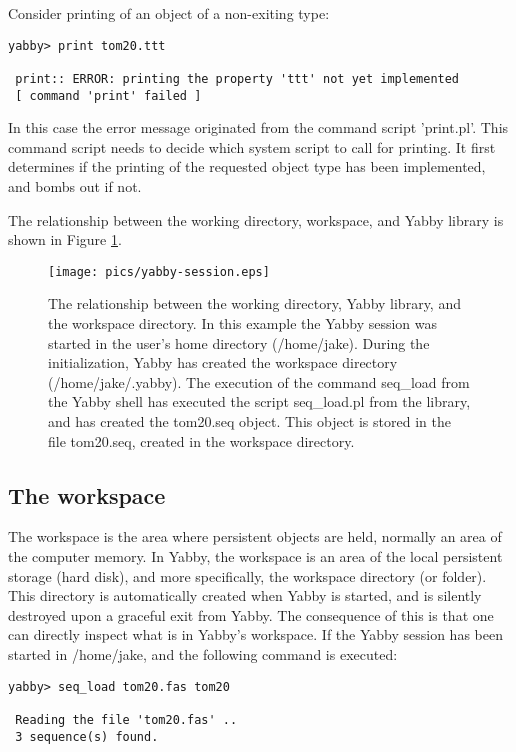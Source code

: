 Consider printing of an object of a non-exiting type:

\begin{verbatim}
yabby> print tom20.ttt

 print:: ERROR: printing the property 'ttt' not yet implemented
 [ command 'print' failed ]
\end{verbatim}

In this case the error message originated from the command script
'print.pl'. This command script needs to decide which system script
to call for printing. It first determines if the printing of the
requested object type has been implemented, and bombs out if not.

The relationship between the working directory, workspace, and Yabby
library is shown in Figure \ref{fig:session}.

\begin{figure}
\centering
\texttt{[image: pics/yabby-session.eps]}
\caption{The relationship between the working directory, Yabby
library, and the workspace directory. In this example the Yabby
session was started in the user's home directory (/home/jake).
During the initialization, Yabby has created the workspace directory
(/home/jake/.yabby). The execution of the command seq\_load from
the Yabby shell has executed the script seq\_load.pl from the
library, and has created the tom20.seq object. This object is
stored in the file tom20.seq, created in the workspace directory.}
\label{fig:session}
\end{figure}

\subsection{The workspace}

The workspace is the area where persistent objects are held,
normally an area of the computer memory. In Yabby, the workspace
is an area of the local persistent storage (hard disk), and more
specifically, the workspace directory (or folder). This directory
is automatically created when Yabby is started, and is silently
destroyed upon a graceful exit from Yabby. The consequence of
this is that one can directly inspect what is in Yabby's workspace. 
If the Yabby session has been started in /home/jake, and the
following command is executed:

\begin{verbatim}
yabby> seq_load tom20.fas tom20

 Reading the file 'tom20.fas' ..
 3 sequence(s) found.
\end{verbatim}

